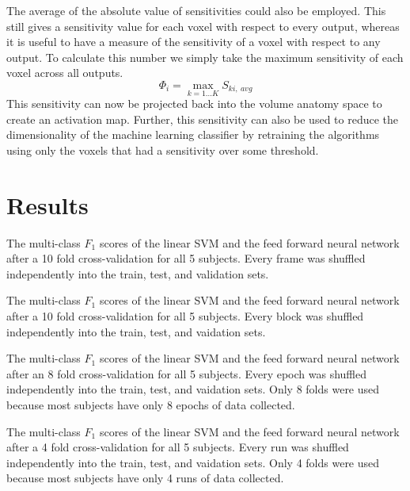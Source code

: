 \documentclass[final]{article}
\begin{document}
The average of the absolute value of sensitivities could also be employed.
This still gives a sensitivity value for each voxel with respect to every output, whereas it is useful to have a measure of the sensitivity of a voxel with respect to any output.
To calculate this number we simply take the maximum sensitivity of each voxel across all outputs.
\begin{equation}
\Phi_{i} = \max_{k=1 \dots K}{S_{ki,~avg}}
\end{equation}
This sensitivity can now be projected back into the volume anatomy space to create an activation map.
Further, this sensitivity can also be used to reduce the dimensionality of the machine learning classifier by retraining the algorithms using only the voxels that had a sensitivity over some threshold.

\section{Results}

\begin{table}[!htbp]
\centering

\caption{
The multi-class $F_1$ scores of the linear SVM and the feed forward neural network after a 10 fold cross-validation for all 5 subjects. 
Every frame was shuffled independently into the train, test, and validation sets.}
\label{tab:frame-shuffle}
\end{table}

\begin{table}[!htbp]
\centering

\caption{
The multi-class $F_1$ scores of the linear SVM and the feed forward neural network after a 10 fold cross-validation for all 5 subjects. 
Every block was shuffled independently into the train, test, and vaidation sets.}
\label{tab:block-shuffle}
\end{table}

\begin{table}[!htbp]
\centering

\caption{
The multi-class $F_1$ scores of the linear SVM and the feed forward neural network after an 8 fold cross-validation for all 5 subjects. 
Every epoch was shuffled independently into the train, test, and vaidation sets. 
Only 8 folds were used because most subjects have only 8 epochs of data collected.}
\label{tab:epoch-shuffle}
\end{table}

\begin{table}[!htbp]
\centering

\caption{
The multi-class $F_1$ scores of the linear SVM and the feed forward neural network after a 4 fold cross-validation for all 5 subjects. 
Every run was shuffled independently into the train, test, and vaidation sets. 
Only 4 folds were used because most subjects have only 4 runs of data collected.}
\label{tab:run-shuffle}
\end{table}
\end{document}

